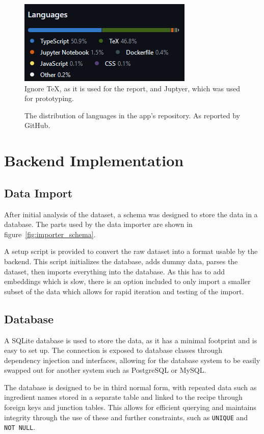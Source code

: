 \begin{figure}[h]
  \centering
  \caption{\label{fig:language_distribution}The distribution of languages in the app's repository. As reported by GitHub.}
  \includegraphics{figures/Languages.png}\\
  \footnotesize{Ignore TeX, as it is used for the report, and Juptyer, which was used for prototyping.}
\end{figure}

\section{Backend Implementation}

\subsection{Data Import}

After initial analysis of the dataset, a schema was designed to store the data in a database. The parts used by the
data importer are shown in figure~\ref{fig:importer_schema}.

A setup script is provided to convert the raw dataset into a format usable by the backend.
This script initializes the database, adds dummy data, parses the dataset, then imports everything
into the database. As this has to add embeddings which is slow, there is an option included
to only import a smaller subset of the data which allows for rapid iteration and testing of the import.

\subsection{Database}

A SQLite database is used to store the data, as it has a minimal footprint and is easy to set up. The connection
is exposed to database classes through dependency injection and interfaces, allowing for the database system to be
easily swapped out for another system such as PostgreSQL or MySQL.

The database is designed to be in third normal form, with repeated data such as ingredient names stored in a separate
table and linked to the recipe through foreign keys and junction tables. This allows for efficient querying and
maintains integrity through the use of these and further constraints, such as \texttt{UNIQUE} and \texttt{NOT NULL}.~\cite{codd_further_1972}

